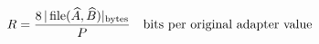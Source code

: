\documentclass[border=3pt]{standalone}
\begin{document}
\color{ink}\fontsize{23}{28}\selectfont
$\displaystyle R=\frac{8\,|\operatorname{file}(\widehat A,\widehat B)|_{\rm bytes}}{P}\quad\text{bits per original adapter value}$
\end{document}

